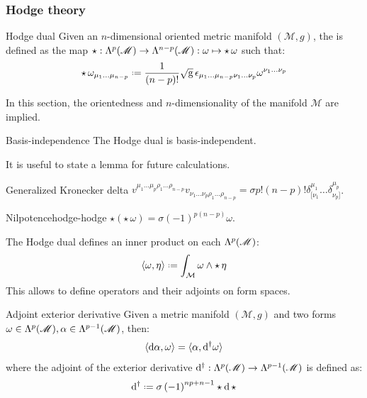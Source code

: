 \subsubsection{Hodge theory}

\begin{definition}{Hodge dual}{}
  Given an $ n $-dimensional oriented metric manifold $ (\mathcal{M},g) $, the  is defined as the map $ \star : \Lambda^{p}(\mathscr{M}) \rightarrow \Lambda^{n-p}(\mathscr{M}) : \omega \mapsto \star\, \omega $ such that:
  \begin{equation}
    \star\, \omega_{\mu_1 \dots \mu_{n-p}} \defeq \frac{1}{(n-p)!} \sqg\, \epsilon_{\mu_1 \dots \mu_{n-p} \nu_1 \dots \nu_p} \omega^{\nu_1 \dots \nu_p}
    \label{eq:hodge-dual}
  \end{equation}
\end{definition}

In this section, the orientedness and $ n $-dimensionality of the manifold $ \mathcal{M} $ are implied.

\begin{proposition}{Basis-independence}{}
  The Hodge dual is basis-independent.
\end{proposition}

It is useful to state a lemma for future calculations.

\begin{lemma}{Generalized Kronecker delta}{}
  $ v^{\mu_1 \dots \mu_p \rho_1 \dots \rho_{n-p}} v_{\nu_1 \dots \nu_p \rho_1 \dots \rho_{n-p}} = \sigma p! (n-p)! \delta^{\mu_1}_{[\nu_1} \dots \delta^{\mu_p}_{\nu_p]} $.
\end{lemma}

\begin{proposition}{Nilpotence}{hodge-hodge}
  $ \star \left( \star\, \omega \right) = \sigma \left( -1 \right)^{p (n-p)} \omega $.
\end{proposition}

The Hodge dual defines an inner product on each $ \Lambda^{p}(\mathscr{M}) $:
\begin{equation}
  \braket{\omega, \eta} \defeq \int_{\mathcal{M}} \omega \wedge \star\, \eta
\end{equation}
This allows to define operators and their adjoints on form spaces.

\begin{proposition}{Adjoint exterior derivative}{}
  Given a metric manifold $ (\mathcal{M},g) $ and two forms $ \omega \in \Lambda^{p}(\mathscr{M}), \alpha \in \Lambda^{p-1}(\mathscr{M}) $, then:
  \begin{equation}
    \braket{\mathrm{d} \alpha,\omega} = \braket{\alpha,\mathrm{d}^{\dagger}\omega}
  \end{equation}
  where the adjoint of the exterior derivative $ \mathrm{d}^{\dagger} : \Lambda^{p}(\mathscr{M}) \rightarrow \Lambda^{p-1}(\mathscr{M}) $ is defined as:
  \begin{equation}
    \dd^{\dagger} \defeq \sigma \left( -1 \right)^{np + n -1} \star \dd \, \star
  \end{equation}
\end{proposition}

